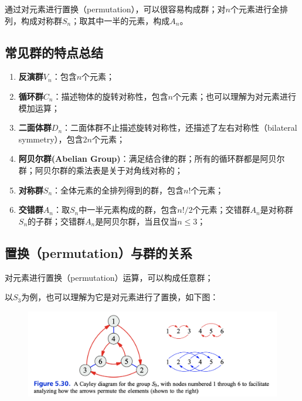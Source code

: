\documentclass[12pt]{article}
\begin{document}
\begin{framed}
\small{
通过对元素进行置换（permutation），可以很容易构成群；对$n$个元素进行全排列，构成对称群$S_n$；取其中一半的元素，构成$A_n$。
}
\end{framed}

\subsection{常见群的特点总结}
\begin{mdframed}[
linecolor=black!40,outerlinewidth=1pt,roundcorner=.5em,innertopmargin=1ex,innerbottommargin=.5\baselineskip,innerrightmargin=1em,innerleftmargin=1em,backgroundcolor=gray!5,
]
\begin{enumerate}
\setlength{\itemsep}{0pt}
\setlength{\parsep}{0pt}
\setlength{\parskip}{0pt}
    \item \textbf{反演群$V_n$}：包含$n$个元素；
    \item \textbf{循环群$C_n$}：描述物体的旋转对称性，包含$n$个元素；也可以理解为对元素进行模加运算；
    \item \textbf{二面体群$D_n$}：二面体群不止描述旋转对称性，还描述了左右对称性（bilateral symmetry），包含$2n$个元素；
    \item \textbf{阿贝尔群(Abelian Group)}：满足结合律的群；所有的循环群都是阿贝尔群；阿贝尔群的乘法表是关于对角线对称的；
    \item \textbf{对称群$S_n$}：全体元素的全排列得到的群，包含$n!$个元素；
    \item \textbf{交错群$A_n$}：取$S_n$中一半元素构成的群，包含$n!/2$个元素；交错群$A_n$是对称群$S_n$的子群；交错群$A_n$是阿贝尔群，当且仅当$n \le 3$；
\end{enumerate}
\end{mdframed}

\subsection{置换（permutation）与群的关系}
对元素进行置换（permutation）运算，可以构成任意群；

以$S_3$为例，也可以理解为它是对元素进行了置换，如下图：
\begin{figure}[H]
    \centering
    \includegraphics[width=1\textwidth]{fig/Group/Cayley-Permutation-S3.png}
\end{figure}
\end{document}
